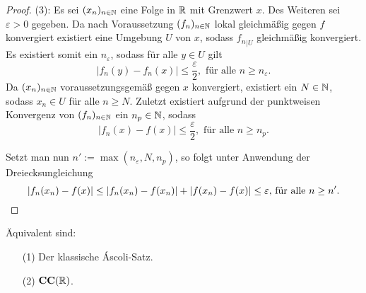 \begin{proof}
  (3): 
  Es sei $(x_n)_{n \in \mathbb{N}}$ eine Folge in $\mathbb{R}$ mit Grenzwert $x$.
  Des Weiteren sei $\varepsilon > 0$ gegeben.
  Da nach Voraussetzung $(f_n)_{n \in \mathbb{N}}$ lokal gleichmäßig gegen $f$ konvergiert existiert eine Umgebung $U$ von $x$, sodass ${f_n}_{|U}$ gleichmäßig konvergiert.
  Es existiert somit ein $n_\varepsilon$, sodass für alle $y \in U$ gilt 
  \begin{displaymath}
    | f_n(y) - f_n(x) | \leq \frac{\varepsilon}{2}, \text{ für alle $n \geq n_\varepsilon$}.
  \end{displaymath}
  Da $(x_n)_{n \in \mathbb{N}}$ voraussetzungsgemäß gegen $x$ konvergiert, existiert ein $N \in \mathbb{N}$, sodass $x_n \in U$ für alle $n \geq N$.
  Zuletzt existiert aufgrund der punktweisen Konvergenz von $(f_n)_{n \in \mathbb{N}}$ ein $n_p \in \mathbb{N}$, sodass
  \begin{displaymath}
    | f_n(x) - f(x) | \leq \frac{\varepsilon}{2}, \text{ für alle $n \geq n_p$}.
  \end{displaymath}

  Setzt man nun $n':= \max(n_\varepsilon, N, n_p)$, so folgt unter Anwendung der Dreiecksungleichung
  \begin{displaymath}
    | f_n(x_n) - f(x) |
    \leq
    | f_n(x_n) - f(x_n) | + | f(x_n) - f(x) | 
    \leq \varepsilon \text{, für alle $n \geq n'$}. \qedhere
  \end{displaymath}

\end{proof}

\begin{thm}
  Äquivalent sind:
  \begin{enumerate}
    \item[(1)] Der klassische Áscoli-Satz.
    \item[(2)] $\mathbf{CC}(\mathbb{R})$.
  \end{enumerate}
\end{thm}

